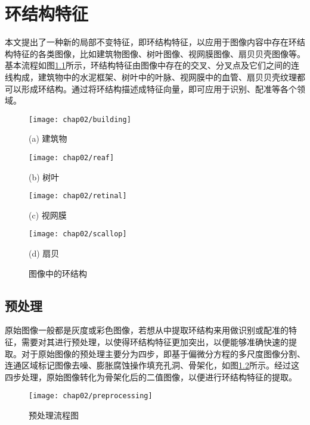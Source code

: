 

\chapter{环结构特征}
\label{cha:cycle}



本文提出了一种新的局部不变特征，即环结构特征，以应用于图像内容中存在环结构特征的各类图像，比如建筑物图像、树叶图像、视网膜图像、扇贝贝壳图像等。基本流程如图\ref{fig:Example}所示，环结构特征由图像中存在的交叉、分叉点及它们之间的连线构成，建筑物中的水泥框架、树叶中的叶脉、视网膜中的血管、扇贝贝壳纹理都可以形成环结构。通过将环结构描述成特征向量，即可应用于识别、配准等各个领域。

\begin{figure}[H]
\centering
  \begin{minipage}[b]{0.48\textwidth} 
      \centering 
      \texttt{[image: chap02/building]}
        \centerline{(a) 建筑物}\medskip
    \end{minipage}
  \begin{minipage}[b]{0.48\textwidth}
    \centering
    \texttt{[image: chap02/reaf]}
      \centerline{(b) 树叶}\medskip
  \end{minipage}
  \begin{minipage}[b]{0.48\textwidth}
    \centering
    \texttt{[image: chap02/retinal]}
      \centerline{(c) 视网膜}\medskip
  \end{minipage}
  \begin{minipage}[b]{0.48\textwidth}
    \centering
    \texttt{[image: chap02/scallop]}
      \centerline{(d) 扇贝}\medskip
  \end{minipage}
\caption{图像中的环结构}
\label{fig:Example}
\end{figure}




\section{预处理}
\label{}

原始图像一般都是灰度或彩色图像，若想从中提取环结构来用做识别或配准的特征，需要对其进行预处理，以使得环结构特征更加突出，以便能够准确快速的提取。对于原始图像的预处理主要分为四步，即基于偏微分方程的多尺度图像分割、连通区域标记图像去噪、膨胀腐蚀操作填充孔洞、骨架化，如图\ref{fig:Preprocessing}所示。经过这四步处理，原始图像转化为骨架化后的二值图像，以便进行环结构特征的提取。
\begin{figure}[H]
\centering
    \centering
    \texttt{[image: chap02/preprocessing]}\medskip
\caption{预处理流程图}
\label{fig:Preprocessing}
\end{figure}

